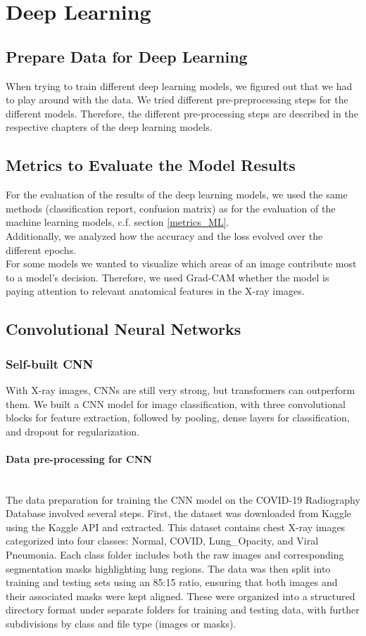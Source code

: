 \documentclass{article}
\begin{document}
\section{Deep Learning}

\subsection{Prepare Data for Deep Learning}
When trying to train different deep learning models, we figured out that we had to play around with the data. We tried different pre-preprocessing steps for the different models. Therefore, the different pre-processing steps are described in the respective chapters of the deep learning models.

\subsection{Metrics to Evaluate the Model Results}
For the evaluation of the results of the deep learning models, we used the same methods (classification report, confusion matrix) as for the evaluation of the machine learning models, c.f. section \ref{metrics_ML}. \\
Additionally, we analyzed how the accuracy and the loss evolved over the different epochs. \\
For some models we wanted to visualize which areas of an image contribute most to a model's decision. Therefore, we used Grad-CAM whether the model is paying attention to relevant anatomical features in the X-ray images.
\subsection{Convolutional Neural Networks}
\subsubsection{Self-built CNN}
With X-ray images, CNNs are still very strong, but transformers can outperform them.
We built a CNN model for image classification, with three convolutional blocks for feature extraction, followed by pooling, dense layers for classification, and dropout for regularization.
\paragraph{Data pre-processing for CNN}\mbox{}\\
The data preparation for training the CNN model on the COVID-19 Radiography Database involved several steps. First, the dataset was downloaded from Kaggle using the Kaggle API and extracted. This dataset contains chest X-ray images categorized into four classes: Normal, COVID, Lung\_Opacity, and Viral Pneumonia. Each class folder includes both the raw images and corresponding segmentation masks highlighting lung regions. The data was then split into training and testing sets using an 85:15 ratio, ensuring that both images and their associated masks were kept aligned. These were organized into a structured directory format under separate folders for training and testing data, with further subdivisions by class and file type (images or masks).
\end{document}
